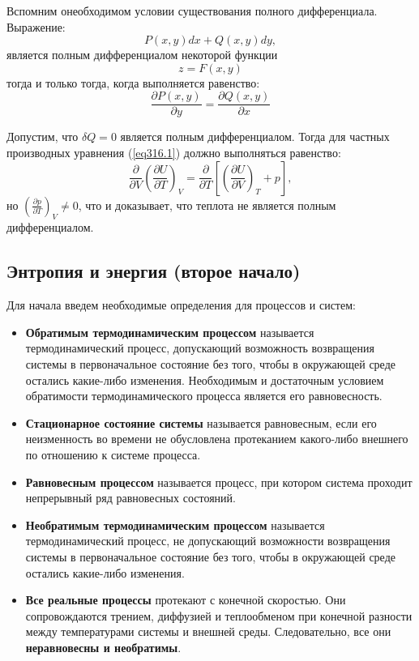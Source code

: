 \documentclass[12pt,a4paper,oneside]{book}
\begin{document}
Вспомним онеобходимом условии существования полного дифференциала. Выражение:
\begin{equation}
	P (x,y) dx + Q (x,y) dy,
\end{equation}
является полным дифференциалом некоторой функции \begin{equation}
	z = F (x,y)
\end{equation} тогда и только тогда, когда выполняется равенство:
\begin{equation}
	\frac{\partial P (x,y)}{\partial y} = \frac{\partial Q (x,y)}{\partial x}
\end{equation}

Допустим, что $\delta Q = 0$ является полным дифференциалом. Тогда для частных производных уравнения (\ref{eq316.1}) должно выполняться равенство:
\begin{equation}
	\frac{\partial}{\partial V} \left( \frac{\partial U}{ \partial T}\right)_{\! V} = 
	\frac{\partial}{\partial T} \left[
			\left( \frac{\partial U}{ \partial V}\right)_{\! T} + p
		\right],
\end{equation}
но $\left( \frac{\partial p}{ \partial T}\right)_{\! V} \not = 0$, что и доказывает, что теплота не является полным дифференциалом.


\subsection{Энтропия и энергия (второе начало)}

Для начала введем необходимые определения для процессов и систем:
\begin{itemize}
\item\textbf{Обратимым термодинамическим процессом} называется термодинамический процесс, допускающий возможность возвращения системы в первоначальное состояние без того, чтобы в окружающей среде остались какие-либо изменения. Необходимым и достаточным условием обратимости термодинамического процесса является его равновесность.
\item\textbf{Стационарное состояние системы} называется равновесным, если его неизменность во времени не обусловлена протеканием какого-либо внешнего по отношению к системе процесса.
\item\textbf{Равновесным процессом} называется процесс, при котором система проходит непрерывный ряд равновесных состояний.
\item\textbf{Необратимым термодинамическим процессом} называется термодинамический процесс, не допускающий возможности возвращения системы в первоначальное состояние без того, чтобы в окружающей среде остались какие-либо изменения.
\item\textbf{Все реальные процессы} протекают с конечной скоростью. Они сопровождаются трением, диффузией и теплообменом при конечной разности между температурами системы и внешней среды. Следовательно, все они \textbf{неравновесны и необратимы}.
\end{itemize}
\end{document}
